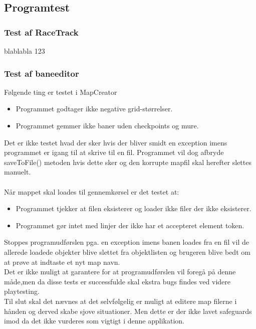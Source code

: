\subsection{Programtest}

\subsubsection{Test af RaceTrack}
blablabla 123

\subsubsection{Test af baneeditor}
Følgende ting er testet i MapCreator
\begin{itemize}
\item Programmet godtager ikke negative grid-størrelser.
\item Programmet gemmer ikke baner uden checkpoints og mure.
\end{itemize}

Det er ikke testet hvad der sker hvis der bliver smidt en exception imens programmet er igang til at skrive til en fil. Programmet vil dog afbryde saveToFile() metoden hvis dette sker og den korrupte mapfil skal herefter slettes manuelt.\\
\\
Når mappet skal loades til gennemkørsel er det testet at:
\begin{itemize}
\item Programmet tjekker at filen eksisterer og loader ikke filer der ikke eksisterer.
\item Programmet gør intet med linjer der ikke har et accepteret element token.
\end{itemize}
Stoppes programudførslen pga. en exception imens banen loades fra en fil vil de allerede loadede objekter blive slettet fra objektlisten og brugeren blive bedt om at prøve at indtaste et nyt map navn.\\
Det er ikke muligt at garantere for at programudførslen vil foregå på denne måde,men da disse tests er successfulde skal ekstra bugs findes ved videre playtesting.
\\
Til slut skal det nævnes at det selvfølgelig er muligt at editere map filerne i hånden og derved skabe sjove situationer. Men dette er der ikke lavet safeguards imod da det ikke vurderes som vigtigt i denne applikation.
